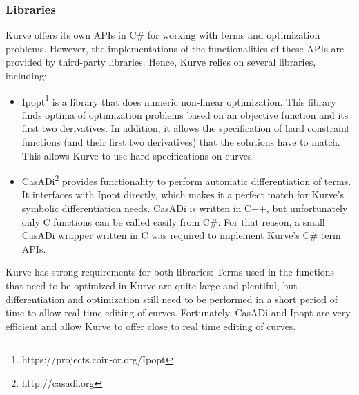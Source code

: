 \documentclass[a4paper]{article}
\begin{document}
			\subsubsection{Libraries}
				
				Kurve offers its own APIs in C\# for working with terms and optimization problems. However, the implementations of the functionalities of these APIs are provided by third-party libraries. Hence, Kurve relies on several libraries, including:
				
				\begin{itemize}
				  	\item Ipopt\footnote{https://projects.coin-or.org/Ipopt} is a library that does numeric non-linear optimization. This library finds optima of optimization problems based on an objective function and its first two derivatives. In addition, it allows the specification of hard constraint functions (and their first two derivatives) that the solutions have to match. This allows Kurve to use hard specifications on curves.
					\item CasADi\footnote{http://casadi.org} provides functionality to perform automatic differentiation of terms. It interfaces with Ipopt directly, which makes it a perfect match for Kurve's symbolic differentiation needs. CasADi is written in C++, but unfortunately only C functions can be called easily from C\#. For that reason, a small CasADi wrapper written in C was required to implement Kurve's C\# term APIs. 
				\end{itemize}
			
				 Kurve has strong requirements for both libraries: Terms used in the functions that need to be optimized in Kurve are quite large and plentiful, but differentiation and optimization still need to be performed in a short period of time to allow real-time editing of curves. Fortunately, CasADi and Ipopt are very efficient and allow Kurve to offer close to real time editing of curves.
\end{document}
